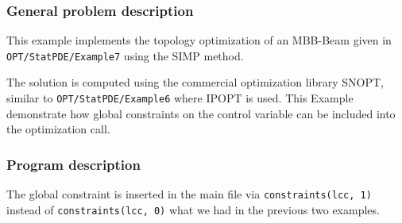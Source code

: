 \subsubsection{General problem description}
This example implements the topology optimization of an MBB-Beam given in \\
{\tt OPT/StatPDE/Example7} using the SIMP method.

The solution is computed using the commercial optimization library SNOPT, similar 
to {\tt OPT/StatPDE/Example6} where IPOPT is used. 
This Example demonstrate how global constraints on
the control variable can be included into the optimization call.

\subsubsection{Program description}
The global constraint is inserted in the main file via 
\texttt{constraints(lcc, 1)} instead of 
\texttt{constraints(lcc, 0)} what we had in the previous two examples.

